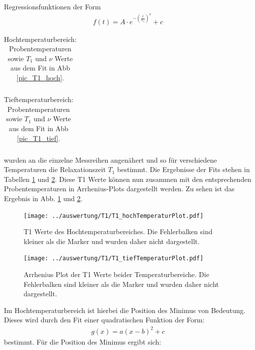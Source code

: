 Regressionsfunktionen der Form 
\begin{align}
	f(t) = A\cdot e^{-\left(\frac{t}{T_1}\right)^\nu}+c
\end{align}
\begin{table}[htbp]
	\begin{tabular}{| >{$}c<{$} | >{$}c<{$} | >{$}c<{$} |}
		
	\end{tabular}
	\caption{Hochtemperaturbereich: Probentemperaturen sowie $T_1$ und $\nu$ Werte aus dem Fit in Abb \ref{pic_T1_hoch}.}
	\label{tab:T1_hoch}
\end{table}
\begin{table}[htbp]
	\begin{tabular}{| >{$}c<{$} | >{$}c<{$} | >{$}c<{$} |}
		
	\end{tabular}
	\caption{Tieftemperaturbereich: Probentemperaturen sowie $T_1$ und $\nu$ Werte aus dem Fit in Abb \ref{pic_T1_tief}.}
	\label{tab:T1_tief}
\end{table}
wurden an die einzelne Messreihen angenähert und so für verschiedene Temperaturen die Relaxationszeit $T_1$ bestimmt. Die Ergebnisse der Fits stehen in Tabellen \ref{tab:T1_hoch} und \ref{tab:T1_tief}.
Diese T1 Werte können nun zusammen mit den entsprechenden Probentemperaturen in Arrhenius-Plots dargestellt werden. Zu sehen ist das Ergebnis in Abb. \ref{pic_T1Arr_hoch} und \ref{pic_T1Arr_tief}.
\begin{figure}[htbp]
	\texttt{[image: ../auswertung/T1/T1\_hochTemperaturPlot.pdf]}
	\caption{T1 Werte des Hochtemperaturbereiches. Die Fehlerbalken sind kleiner als die Marker und wurden daher nicht dargestellt.}
	\label{pic_T1Arr_hoch}
\end{figure}
\begin{figure}[htbp]
	\texttt{[image: ../auswertung/T1/T1\_tiefTemperaturPlot.pdf]}
	\caption{Arrhenius Plot der T1 Werte beider Temperaturbereiche. Die Fehlerbalken sind kleiner als die Marker und wurden daher nicht dargestellt.}
	\label{pic_T1Arr_tief}
\end{figure}
Im Hochtemperaturbereich ist hierbei die Position des Minimus von Bedeutung. Dieses wird durch den Fit einer quadratischen Funktion der Form:
\begin{align}
	g(x) = a(x-b)^2+c
\end{align}
bestimmt. Für die Position des Minimus ergibt sich:
\begin{align*}
	
\end{align*}

